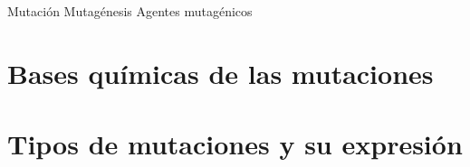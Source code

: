 
Mutación
Mutagénesis
Agentes mutagénicos

\section{Bases químicas de las mutaciones}



\section{Tipos de mutaciones y su expresión}

